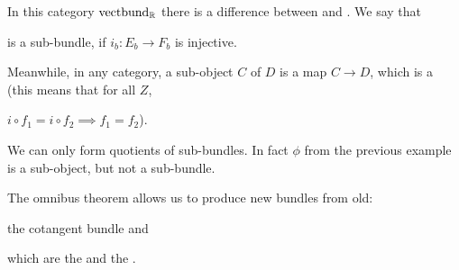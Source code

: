 \begin{remark}[Warning]
    In this category \(\text{vectbund}_{\mathbb{R}}\) there is a difference between 
     and . 
    We say that 
    is a sub-bundle, if \(i_b:E_b\to F_b\) is injective.

    Meanwhile, in any category, a sub-object \(C\) of \(D\) is a map \(C\to D\), which is a 
     (this means that for all \(Z\), 
    \(i\circ f_1=i\circ f_2\implies f_1=f_2\)).
    
    We can only form quotients of sub-bundles. In fact \(\phi\) from the previous example is a 
    sub-object, but not a sub-bundle.
\end{remark} 

The omnibus theorem allows us to produce new bundles from old:
\begin{example}
    \begin{center}
    \end{center}
    the cotangent bundle and 
    \begin{center}
    \end{center}
    which are the  and the .
\end{example}


